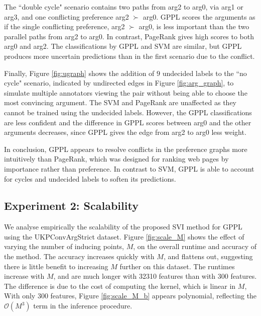 The ``double cycle" scenario contains two paths from arg2 to arg0, via arg1 or arg3, and one conflicting
preference arg2 $\succ$ arg0. 
GPPL scores the arguments as if the single conflicting preference, arg2 $\succ$ arg0, 
is less important than the two parallel paths from arg2 to arg0. 
In contrast, PageRank gives high scores to both arg0 and arg2.
The classifications by GPPL and SVM are similar, but GPPL produces more uncertain 
predictions than in the first scenario due to the conflict.

Finally,  Figure \ref{fig:ugraph} shows the addition of $9$ undecided labels to the ``no cycle" scenario, indicated by 
undirected edges in Figure \ref{fig:arg_graph}, to simulate multiple annotators viewing the pair without being able to choose the most convincing argument.
The SVM and PageRank are unaffected as they cannot be trained using the undecided labels.
However, the GPPL classifications are less confident and the difference in GPPL scores between arg0 and the other arguments decreases, since GPPL gives the edge from arg2 to arg0 less weight.

In conclusion, GPPL appears to resolve conflicts in the preference graphs
more intuitively than PageRank, which was designed for ranking web pages by 
importance rather than preference. 
In contrast to SVM, GPPL is able to account for cycles and undecided labels to soften its predictions.

\subsection{Experiment 2: Scalability}

We analyse empirically the scalability of the proposed SVI method for GPPL using the UKPConvArgStrict dataset.
Figure \ref{fig:scale_M} shows the effect of varying the number of inducing points, $M$, on the overall runtime and accuracy of the method. The accuracy increases quickly with $M$, and flattens out, suggesting there is little benefit to increasing  $M$ further on this dataset. 
The runtimes 
increase with $M$,  and are much longer with 32310 features than with 300 features.
The difference is due to the cost of computing the kernel, which is linear in $M$,
With only $300$ features, Figure \ref{fig:scale_M_b} appears polynomial, reflecting the $\mathcal{O}(M^3)$ term in the inference procedure. 

